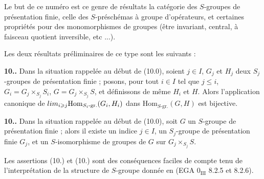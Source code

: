 \documentclass[11pt,a4paper]{article}
\begin{document}
Le but de ce numéro est   ce genre de résultats   la catégorie des
$S$-groupes de présentation finie,  celle des $S$-préschémas
à groupe d'opérateurs, et   certaines propriétés pour
des monomorphismes de groupes (être invariant, central, à faisceau
quotient inversible, etc ...).

Les deux résultats préliminaires de ce type sont les suivants :

\textbf{10..} Dans la situation rappelée au début de
(10.0), soient \struck{\ill{}} $j \in I$, $G_{j}$ et $H_{j}$ deux
$S_{j}$-groupes de présentation finie ; posons, pour tout $i \in I$ tel
que $j \leqslant i$, $G_{i} = G_{j} \times_{S_{j}} S_{i}$,
$G = G_{j} \times_{S_{j}} S$, et définissons de même $H_{i}$ et $H$. Alors
l'application canonique de
$\varinjlim_{i \geqslant j} \mathrm{Hom}_{S_{i}\text{-gr.}}(G_{i}, H_{i})$
dans $\mathrm{Hom}_{S\text{-gr.}}(G, H)$ est bijective.

\textbf{10..} Dans la situation rappelée au début de
(10.0), soit $G$ un $S$-groupe de présentation finie ; alors il existe un
indice $j \in I$,  un $S_{j}$-groupe de présentation finie
$G_{j}$, et un \struck{\ill{}} $S$-isomorphisme de groupes de $G$ sur
$G_{j} \times_{S_{j}} S$.

Les assertions (10.) et (10.) sont des
conséquences faciles de   compte tenu de l'interprétation de la structure de $S$-groupe
donnée en (EGA $0_{\mathrm{III}}$ 8.2.5 et 8.2.6).



\end{document}
